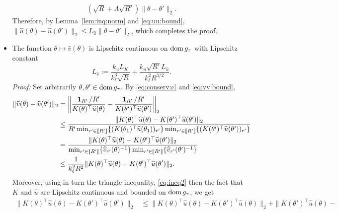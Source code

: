 \begin{itemize}
\begin{align*}
      (\sqrt{R} + \Lambda\sqrt{R'}) \|\theta -   \theta'\|_2.
  \end{align*}
  Therefore,    by     Lemma~\ref{lem:inq:norm}    and    \eqref{eq:uu:bound},
  $\|\widehat{u}(\theta) -\widehat{u}(\theta')\|_2 \leq L_{\hat{u}} \|\theta -
  \theta'\|_2$, which completes the proof.
\item  The   function  $\theta   \mapsto  \widehat{v}(\theta)$   is  Lipschitz
  continuous on $\operatorname{dom} g_{\tau}$ with Lipschitz constant
  \begin{equation*}
    L_{\widehat{v}}:=                    
    \frac{k_{u}L_{K}}{k_{\ell}^{3}\sqrt{R}}     +     \frac{k_{u}     \sqrt{R'}
      L_{\hat{u}}}{k_{\ell}^{2} R^{3/2}}.  
  \end{equation*}
  \textit{Proof:}  Set arbitrarily  $\theta,\theta'  \in  \operatorname{dom} g_{\tau}$.   By
  \eqref{eq:conserv:c} and \eqref{eq:vv:bound},
  \begin{align*}
    \|\widehat{v}(\theta) - \widehat{v}(\theta')\|_2
    &=   \left\|\frac{\operatorname{\textbf{1}}_{R'}/R'}{K(\theta)^{\top}  \widehat{u}(\theta)}   -
      \frac{\operatorname{\textbf{1}}_{R'}/R'}{K(\theta')^{\top}              \widehat{u}(\theta')}
      \right\|_{2}\\ 
    &\leq  \frac{\|K(\theta)^{\top}  \widehat{u}(\theta)  -  K(\theta')^{\top}
      \widehat{u}(\theta')\|_{2}}     {R'\min_{r'     \in      \llbracket     R'     \rrbracket}
      \{(K(\theta_{1})^{\top}  \widehat{u}(\theta_{1}))_{r'}\}   \min_{r'
      \in \llbracket R' \rrbracket} \{(K(\theta')^{\top} \widehat{u}(\theta'))_{r'}\}} \\
    &=  \frac{\|K(\theta)^{\top}  \widehat{u}(\theta)  -  K(\theta')^{\top}
      \widehat{u}(\theta')\|_{2}}     {\min_{r'     \in      \llbracket     R'     \rrbracket}
      \{\widehat{v}_{r'}(\theta)^{-1}\}   \min_{r'    \in   \llbracket    R'   \rrbracket}
      \{\widehat{v}_{r'}(\theta')^{-1}\}} \\ 
    &\leq \frac{1}{k_{\ell}^{2}R^{2}} \|K(\theta)^{\top} \widehat{u}(\theta) -
      K(\theta')^{\top} \widehat{u}(\theta')\|_{2}.  
    \end{align*}
    Moreover, using in turn the triangle inequality, \eqref{eq:ineq2} then the
    fact that  $K$ and $\widehat{u}$  are Lipschitz continuous and  bounded on
    $\operatorname{dom} g_{\tau}$, we get
    \begin{align*}
      \|K(\theta)^{\top}      \widehat{u}(\theta)     -      K(\theta')^{\top}
      \widehat{u}(\theta')\|_{2} 
      &\leq   \|K(\theta)^{\top}   \widehat{u}(\theta)   -   K(\theta')^{\top}
        \widehat{u}(\theta)\|_{2} + \|K(\theta')^{\top} \widehat{u}(\theta) -

\end{align*}
\end{itemize}
